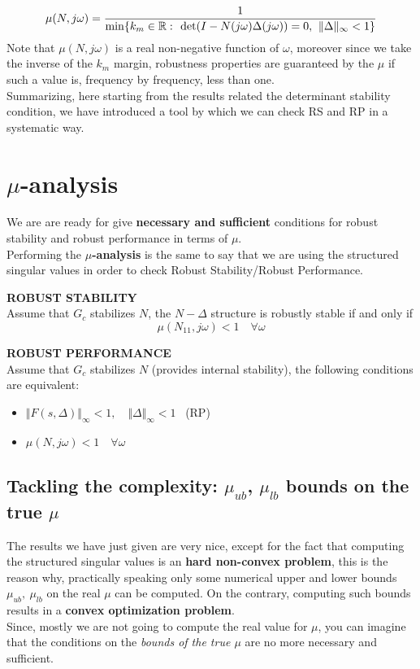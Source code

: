 \documentclass[a4paper, 12pt]{article}
\begin{document}
\begin{equation}
    \large
    \mu(N,j\omega)=\frac{1}{\min\{k_m\in\mathbb{R}: \ \det(I-N(j\omega)\Delta(j\omega))=0, \ \Vert \Delta \Vert_\infty < 1\}}
\end{equation}
Note that $\mu(N,j\omega)$ is a real non-negative function of $\omega$, moreover since we take the inverse of the $k_m$ margin, robustness properties are guaranteed by the $\mu$ if such a value is, frequency by frequency, less than one.\\
Summarizing, here starting from the results related the determinant stability condition, we have introduced a tool by which we can check RS and RP in a systematic way.

\section{$\mu$-analysis}
We are are ready for give \textbf{necessary and sufficient} conditions for robust stability and robust performance in terms of $\mu$.\\
 Performing the \textbf{$\mu$-analysis} is the same to say that we are using the structured singular values in order to check Robust Stability/Robust Performance.

\begin{multicols}{2}
    \noindent\textsf{\textbf{ ROBUST STABILITY}}\\
    Assume that $G_c$ stabilizes $N$, the $N-\Delta$ structure is robustly stable if and only if
    \begin{equation}
        \mu(N_{11}, j\omega) < 1 \quad \forall \omega 
    \end{equation}
    
    \newcolumn
    \noindent
    \textsf{\textbf{ROBUST PERFORMANCE}}\\
    Assume that $G_c$ stabilizes $N$ (provides internal stability), the following conditions are equivalent: 
    \begin{itemize}
        \itemsep-0.3em
        \item $\Vert F(s,\Delta) \Vert_\infty < 1, \quad \Vert \Delta \Vert_\infty<1$  \ \textsf{(RP)}
        \item $\mu(N,j\omega)<1 \quad \forall \omega$ 
    \end{itemize}
\end{multicols}

\subsection{Tackling the complexity: $\mu_{ub}$, $\mu_{lb}$ bounds on the true $\mu$}
The results we have just given are very nice, except for the fact that computing the structured singular values is an \textbf{hard non-convex problem}, this is the reason why, practically speaking only some numerical upper and lower bounds $\mu_{ub}, \ \mu_{lb}$ on the real $\mu$ can be computed. On the contrary, computing such bounds results in a \textbf{convex optimization problem}.\\
Since, mostly we are not going to compute the real value for $\mu$, you can imagine that the conditions on the \textit{bounds of the true $\mu$} are no more necessary and sufficient.
\end{document}
